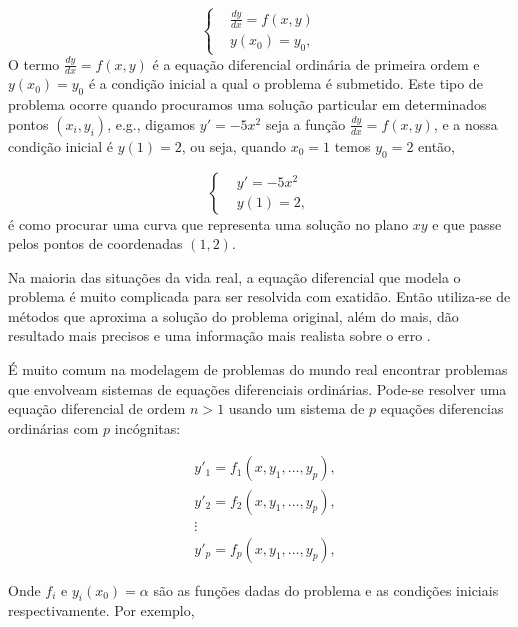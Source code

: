 \begin{equation*}
\left\{
\begin{aligned}
 &\frac{dy}{dx} = f(x,y) \\
 &y(x_{0}) = y_{0},
\end{aligned}
\right.
\end{equation*}
O termo $\frac{dy}{dx} = f(x,y)$ é a equação diferencial ordinária de primeira ordem e
$y(x_{0}) = y_{0}$ é a condição inicial a qual o problema é submetido. Este tipo
de problema ocorre quando procuramos uma solução particular em determinados pontos $(x_{i},y_{i})$, e.g., digamos $y' = -5x^{2}$
seja a função $\frac{dy}{dx} = f(x,y)$, e a nossa condição inicial é $y(1) = 2$,
ou seja, quando $x_{0} = 1$ temos $y_{0} = 2$ então,

\begin{equation*}
\left\{
\begin{aligned}
 &y' = -5x^{2} \\
 &y(1) = 2,
\end{aligned}
\right.
\end{equation*}
é como procurar uma curva que representa uma solução no plano $xy$ e que passe
pelos pontos de coordenadas $(1,2)$.

Na maioria das situações da vida real, a equação diferencial que modela o problema
é muito complicada para ser resolvida com exatidão. Então utiliza-se de métodos que
aproxima a solução do problema original, além do mais, dão resultado mais precisos e
uma informação mais realista sobre o erro \cite{faires}.

É muito comum na modelagem de problemas do mundo real encontrar problemas que envolveam
sistemas de equações diferenciais ordinárias. Pode-se resolver uma equação
diferencial de ordem $n > 1$ usando um sistema de $p$ equações diferencias
ordinárias com $p$ incógnitas:

\begin{equation*}
\begin{aligned}
&y'_{1} = f_{1}(x,y_{1},\dotsc,y_{p}),\\
&y'_{2} = f_{2}(x,y_{1},\dotsc,y_{p}),\\
&\vdots \\
&y'_{p} = f_{p}(x,y_{1},\dotsc,y_{p}),
\end{aligned}
\end{equation*}

Onde $f_{i}$ e $y_{i}(x_{0}) = \alpha$ são as funções dadas do problema e as condições
iniciais respectivamente. Por exemplo,

